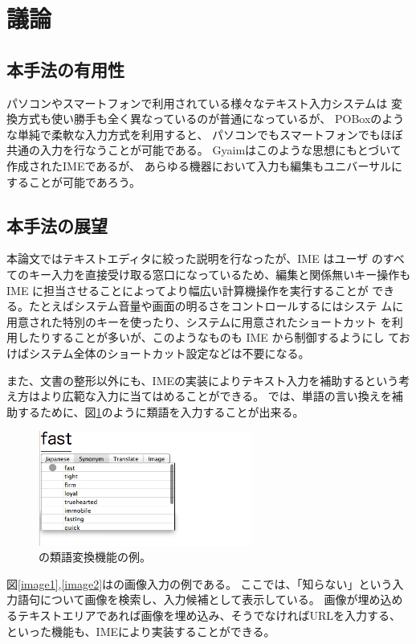 \section{議論}

\subsection{本手法の有用性}

パソコンやスマートフォンで利用されている様々なテキスト入力システムは
変換方式も使い勝手も全く異なっているのが普通になっているが、
POBox\cite{Masui:POBox}のような単純で柔軟な入力方式を利用すると、
パソコンでもスマートフォンでもほぼ共通の入力を行なうことが可能である。
Gyaimはこのような思想にもとづいて作成されたIMEであるが、
{\system}
あらゆる機器において入力も編集もユニバーサルにすることが可能であろう。

\subsection{本手法の展望}

本論文ではテキストエディタに絞った説明を行なったが、IME はユーザ
のすべてのキー入力を直接受け取る窓口になっているため、編集と関係無いキー操作も IME に担当させることによってより幅広い計算機操作を実行することが
できる。たとえばシステム音量や画面の明るさをコントロールするにはシステ
ムに用意された特別のキーを使ったり、システムに用意されたショートカット
を利用したりすることが多いが、このようなものも IME から制御するようにし
ておけばシステム全体のショートカット設定などは不要になる。


また、文書の整形以外にも、IMEの実装によりテキスト入力を補助するという考え方はより広範な入力に当てはめることができる。
{\system}では、単語の言い換えを補助するために、図\ref{synonym}のように類語を入力することが出来る。

\begin{figure}[H]
\centerline{\includegraphics[width=70mm,bb=0 0 350 250]{figures/synonym.png}}
\caption{{\system}の類語変換機能の例。}
\label{synonym}
\end{figure}

図\ref{image1},\ref{image2}は{\system}の画像入力の例である。
ここでは、「知らない」という入力語句について画像を検索し、入力候補として表示している。
画像が埋め込めるテキストエリアであれば画像を埋め込み、そうでなければURLを入力する、といった機能も、IMEにより実装することができる。

